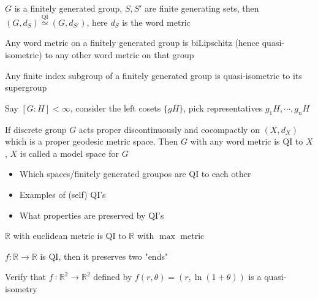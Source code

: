 \documentclass[main]{subfiles}
\begin{document}
\begin{example}
$G$ is a finitely generated group, $S,S'$ are finite generating sets, then $(G,d_S)\overset{\text{QI}}{\simeq}(G,d_{S'})$, here $d_S$ is the word metric
\end{example}

\begin{exercise}
Any word metric on a finitely generated group is biLipschitz (hence quasi-isometric) to any other word metric on that group
\end{exercise}

\begin{exercise}
Any finite index subgroup of a finitely generated group is quasi-isometric to its supergroup
\end{exercise}

\begin{solution}
Say $[G:H]<\infty$, consider the left cosets $\{gH\}$, pick representatives $g_1H,\cdots,g_nH$
\end{solution}

\begin{example}
If discrete group $G$ acts proper discontinuously and cocompactly on $(X,d_X)$ which is a proper geodesic metric space. Then $G$ with any word metric is QI to $X$, $X$ is called a model space for $G$
\end{example}

\begin{question}
\begin{itemize}
\item Which spaces/finitely generated groupos are QI to each other
\item Examples of (self) QI's
\item What properties are preserved by QI's
\end{itemize}
\end{question}

\begin{example}
$\mathbb R$ with euclidean metric is QI to $\mathbb R$ with $\max$ metric
\end{example}

\begin{example}
$f:\mathbb R\to\mathbb R$ is QI, then it preserves two "ends"
\end{example}

\begin{exercise}
Verify that $f ∶\mathbb R^2 \to\mathbb R^2$ defined by $f(r, \theta) = (r, \ln(1 + \theta))$ is a quasi-isometry
\end{exercise}
\end{document}
